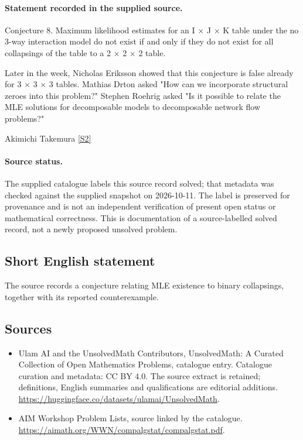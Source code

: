 \documentclass[11pt]{article}
\begin{document}
\paragraph{Statement recorded in the supplied source.}
Conjecture 8. Maximum likelihood estimates for an I × J × K table under the no 3-way interaction model do not exist if and only if they do not exist for all collapsings of the table to a 2 × 2 × 2 table.

Later in the week, Nicholas Eriksson showed that this conjecture is false already for 3 × 3 × 3 tables. Mathias Drton asked "How can we incorporate structural zeroes into this problem?" Stephen Roehrig asked "Is it possible to relate the MLE solutions for decomposable models to decomposable network flow problems?"

Akimichi Takemura \href{https://aimath.org/WWN/compalgstat/compalgstat.pdf}{[S2]}
\paragraph{Source status.}
The supplied catalogue labels this source record solved; that metadata was checked against the supplied snapshot on 2026-10-11. The label is preserved for provenance and is not an independent verification of present open status or mathematical correctness. This is documentation of a source-labelled solved record, not a newly proposed unsolved problem.
\subsection{Short English statement}
The source records a conjecture relating MLE existence to binary collapsings, together with its reported counterexample.
\subsection{Sources}
\begin{itemize}
\item[S1] Ulam AI and the UnsolvedMath Contributors, UnsolvedMath: A Curated Collection of Open Mathematics Problems, catalogue entry. Catalogue curation and metadata: CC BY 4.0. The source extract is retained; definitions, English summaries and qualifications are editorial additions.
\url{https://huggingface.co/datasets/ulamai/UnsolvedMath}.
\item[S2] AIM Workshop Problem Lists, source linked by the catalogue.
\url{https://aimath.org/WWN/compalgstat/compalgstat.pdf}.
\end{itemize}
\end{document}
